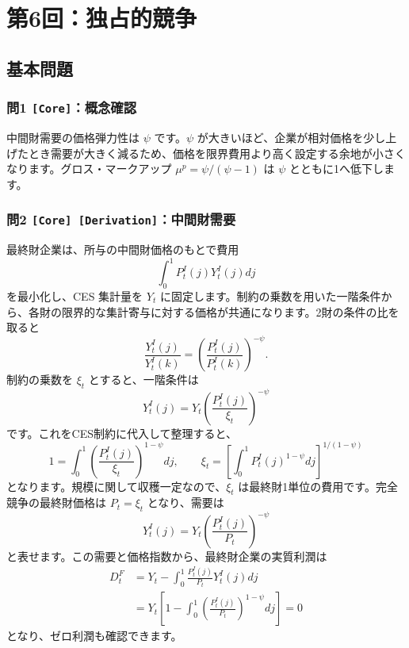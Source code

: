 \documentclass[
  japanese,
  lualatex,
  ja=standard,
  11pt,
  a4paper]{ltjsarticle}
\begin{document}
\clearpage

\section{第6回：独占的競争}\label{ux7b2c6ux56deux72ecux5360ux7684ux7af6ux4e89}

\subsection{基本問題}\label{ux57faux672cux554fux984c-5}

\subsubsection{\texorpdfstring{問1
\texttt{{[}Core{]}}：概念確認}{問1 {[}Core{]}：概念確認}}\label{ux554f1-coreux6982ux5ff5ux78baux8a8d-1}

中間財需要の価格弾力性は \(\psi\) です。\(\psi\)
が大きいほど、企業が相対価格を少し上げたとき需要が大きく減るため、価格を限界費用より高く設定する余地が小さくなります。グロス・マークアップ
\(\mu^p=\psi/(\psi-1)\) は \(\psi\) とともに1へ低下します。

\subsubsection{\texorpdfstring{問2
\texttt{{[}Core{]}\ {[}Derivation{]}}：中間財需要}{問2 {[}Core{]} {[}Derivation{]}：中間財需要}}\label{ux554f2-core-derivationux4e2dux9593ux8ca1ux9700ux8981}

最終財企業は、所与の中間財価格のもとで費用 \[
\int_0^1P_t^I(j)Y_t^I(j)dj
\] を最小化し、CES 集計量を \(Y_t\)
に固定します。制約の乗数を用いた一階条件から、各財の限界的な集計寄与に対する価格が共通になります。2財の条件の比を取ると
\[
\frac{Y_t^I(j)}{Y_t^I(k)}
=\left(\frac{P_t^I(j)}{P_t^I(k)}\right)^{-\psi}.
\] 制約の乗数を \(\xi_t\) とすると、一階条件は \[
Y_t^I(j)=Y_t\left(\frac{P_t^I(j)}{\xi_t}\right)^{-\psi}
\] です。これをCES制約に代入して整理すると、 \[
1=\int_0^1\left(\frac{P_t^I(j)}{\xi_t}\right)^{1-\psi}dj,
\qquad
\xi_t=\left[\int_0^1P_t^I(j)^{1-\psi}dj\right]^{1/(1-\psi)}
\] となります。規模に関して収穫一定なので、\(\xi_t\)
は最終財1単位の費用です。完全競争の最終財価格は \(P_t=\xi_t\)
となり、需要は \[
Y_t^I(j)=Y_t\left(\frac{P_t^I(j)}{P_t}\right)^{-\psi}
\] と表せます。この需要と価格指数から、最終財企業の実質利潤は \[
\begin{aligned}
D_t^F
&=Y_t-\int_0^1\frac{P_t^I(j)}{P_t}Y_t^I(j)dj\\
&=Y_t\left[1-\int_0^1
\left(\frac{P_t^I(j)}{P_t}\right)^{1-\psi}dj\right]=0
\end{aligned}
\] となり、ゼロ利潤も確認できます。
\end{document}
